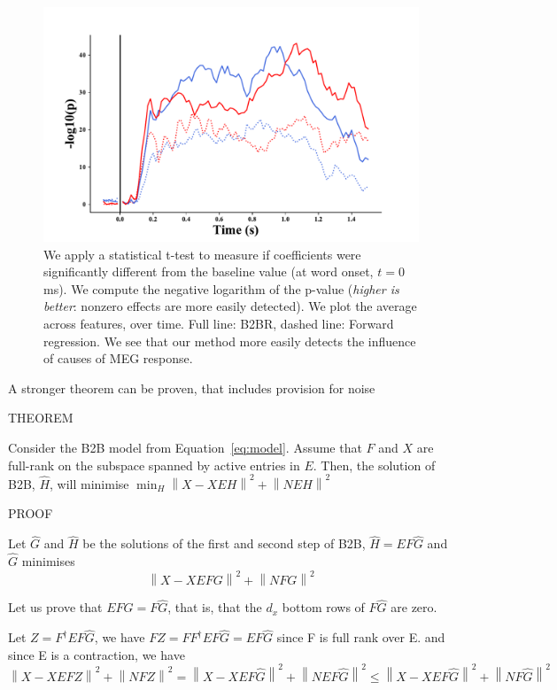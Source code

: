 \documentclass{article}
\begin{document}
\begin{figure}[h]
  \centering
  \includegraphics[width=\textwidth, trim=0cm 0cm 0cm 0cm]{figures/pvalues.pdf}
  \caption{We apply a statistical t-test to measure if coefficients were significantly different from the baseline value (at word onset, $t=0$ms).
  We compute the negative logarithm of the p-value (\textit{higher is better}: nonzero effects are more easily detected). We plot the average across features, over time.
  Full line: B2BR, dashed line: Forward regression. We see that our method more easily detects the influence of causes of MEG response.}
\end{figure}

\clearpage
\newpage
A stronger theorem can be proven, that includes provision for noise


THEOREM

    Consider the B2B model from Equation~\ref{eq:model}.
    Assume that $F$ and $X$ are full-rank on the subspace spanned by active entries in $E$.
    Then, the solution of B2B, $\hat H$, will minimise 
    $\min_H  \left \| X - XEH\right\| ^2  + \left \| NEH\right \| ^2$

PROOF

Let $\hat G$ and $\hat H$ be the solutions of the first and second step of B2B, $\hat H=EF\hat G$ and $\hat G$ minimises 
\begin{equation}
	\left \| X - XEFG\right\| ^2  + \left \| NFG\right \| ^2
    \label{eq:doublenorm}
\end{equation}

Let us prove that $EF\hat G = F\hat G$, that is, that the $d_x$ bottom rows of $F\hat G$ are zero. 

Let $Z=F^\dagger EF\hat G$, we have $FZ = FF^\dagger EF  \hat G= EF\hat G$ since F is full rank over E. and since E is a contraction, we have 
$$\left \| X - XEFZ\right \| ^2  + \left \| NFZ\right \| ^2 = \left \| X - XEF\hat G\right \| ^2  + \left \| NEF\hat G\right \| ^2 \leq \left \| X - XEF\hat G\right \| ^2  + \left \| NF\hat G\right \| ^2$$
\end{document}
